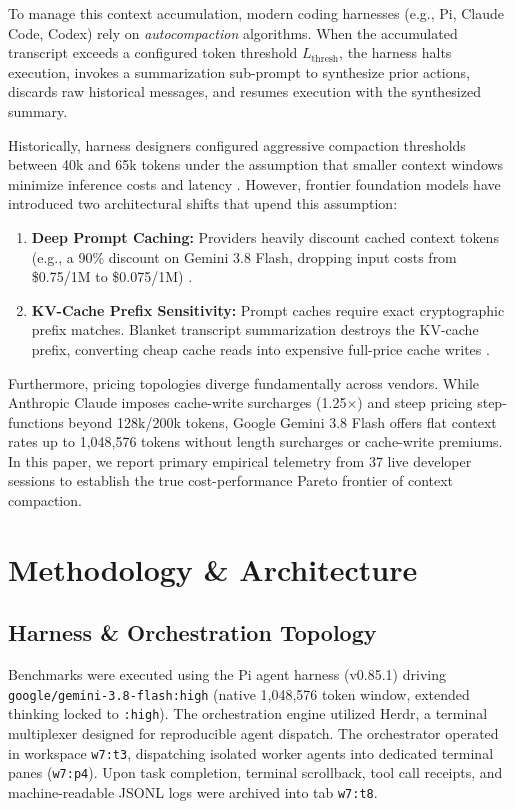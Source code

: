 \documentclass[10pt,twocolumn,a4paper]{article}
\begin{document}
To manage this context accumulation, modern coding harnesses (e.g., Pi, Claude Code, Codex) rely on \textit{autocompaction} algorithms. When the accumulated transcript exceeds a configured token threshold $L_{\text{thresh}}$, the harness halts execution, invokes a summarization sub-prompt to synthesize prior actions, discards raw historical messages, and resumes execution with the synthesized summary.

Historically, harness designers configured aggressive compaction thresholds between 40k and 65k tokens under the assumption that smaller context windows minimize inference costs and latency \cite{nova2026compaction}. However, frontier foundation models have introduced two architectural shifts that upend this assumption:
\begin{enumerate}
  \item \textbf{Deep Prompt Caching:} Providers heavily discount cached context tokens (e.g., a 90\% discount on Gemini 3.8 Flash, dropping input costs from \$0.75/1M to \$0.075/1M) \cite{anthropic2024promptcache,gim2024promptcache}.
  \item \textbf{KV-Cache Prefix Sensitivity:} Prompt caches require exact cryptographic prefix matches. Blanket transcript summarization destroys the KV-cache prefix, converting cheap cache reads into expensive full-price cache writes \cite{gim2024promptcache}.
\end{enumerate}

Furthermore, pricing topologies diverge fundamentally across vendors. While Anthropic Claude imposes cache-write surcharges (1.25$\times$) and steep pricing step-functions beyond 128k/200k tokens, Google Gemini 3.8 Flash offers flat context rates up to 1,048,576 tokens without length surcharges or cache-write premiums. In this paper, we report primary empirical telemetry from 37 live developer sessions to establish the true cost-performance Pareto frontier of context compaction.

\section{Methodology \& Architecture}

\subsection{Harness \& Orchestration Topology}
Benchmarks were executed using the Pi agent harness (v0.85.1) driving \texttt{google/gemini-3.8-flash:high} (native 1,048,576 token window, extended thinking locked to \texttt{:high}). The orchestration engine utilized Herdr, a terminal multiplexer designed for reproducible agent dispatch. The orchestrator operated in workspace \texttt{w7:t3}, dispatching isolated worker agents into dedicated terminal panes (\texttt{w7:p4}). Upon task completion, terminal scrollback, tool call receipts, and machine-readable JSONL logs were archived into tab \texttt{w7:t8}.
\end{document}
